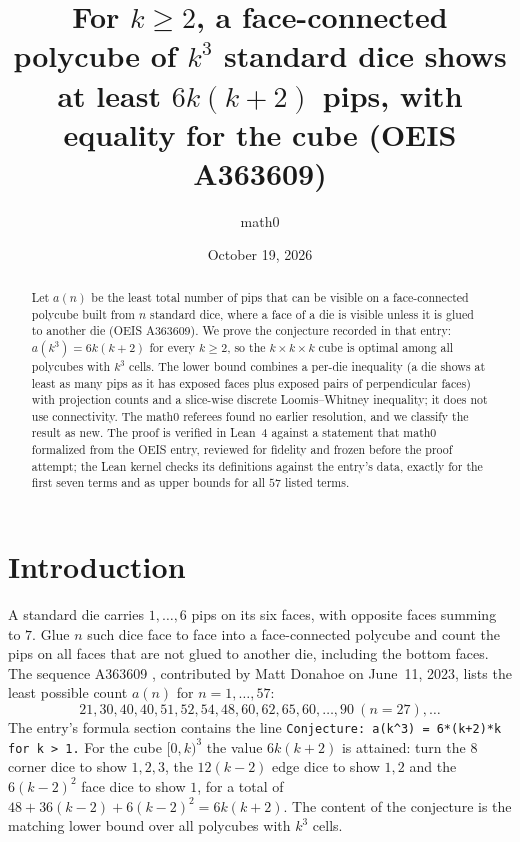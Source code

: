\documentclass[11pt]{amsart}
\title[A polycube of $k^3$ dice shows at least $6k(k+2)$ pips]{For $k\ge2$, a face-connected polycube of $k^3$ standard dice shows at least $6k(k+2)$ pips, with equality for the cube (OEIS A363609)}
\author{math0}
\date{October 19, 2026}
\theoremstyle{plain}
\theoremstyle{definition}
\begin{document}
\begin{abstract}
Let $a(n)$ be the least total number of pips that can be visible on a face-connected polycube built from $n$ standard dice, where a face of a die is visible unless it is glued to another die (OEIS A363609). We prove the conjecture recorded in that entry: $a(k^3)=6k(k+2)$ for every $k\ge2$, so the $k\times k\times k$ cube is optimal among all polycubes with $k^3$ cells. The lower bound combines a per-die inequality (a die shows at least as many pips as it has exposed faces plus exposed pairs of perpendicular faces) with projection counts and a slice-wise discrete Loomis--Whitney inequality; it does not use connectivity. The math0 referees found no earlier resolution, and we classify the result as new. The proof is verified in Lean~4 against a statement that math0 formalized from the OEIS entry, reviewed for fidelity and frozen before the proof attempt; the Lean kernel checks its definitions against the entry's data, exactly for the first seven terms and as upper bounds for all $57$ listed terms.
\end{abstract}
\maketitle

\section{Introduction}

A standard die carries $1,\dots,6$ pips on its six faces, with opposite faces summing to $7$. Glue $n$ such dice face to face into a face-connected polycube and count the pips on all faces that are not glued to another die, including the bottom faces. The sequence A363609 \cite{A363609}, contributed by Matt Donahoe on June~11, 2023, lists the least possible count $a(n)$ for $n=1,\dots,57$:
\[
21,30,40,40,51,52,54,48,60,62,65,60,\dots,90\ (n=27),\dots
\]
The entry's formula section contains the line \texttt{Conjecture: a(k\^{}3) = 6*(k+2)*k for k > 1.} For the cube $[0,k)^3$ the value $6k(k+2)$ is attained: turn the $8$ corner dice to show $1,2,3$, the $12(k-2)$ edge dice to show $1,2$ and the $6(k-2)^2$ face dice to show $1$, for a total of $48+36(k-2)+6(k-2)^2=6k(k+2)$. The content of the conjecture is the matching lower bound over all polycubes with $k^3$ cells.
\end{document}

